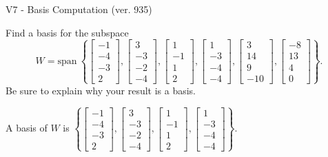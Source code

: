 \begin{exercise}
  \begin{exerciseTitle}V7 - Basis Computation (ver. 935)\end{exerciseTitle}
  \begin{exerciseStatement}
    Find a basis for the subspace 
\[W=\mathrm{span}\ \left\{\left[\begin{array}{r}
-1 \\
-4 \\
-3 \\
2
\end{array}\right] , \left[\begin{array}{r}
3 \\
-3 \\
-2 \\
-4
\end{array}\right] , \left[\begin{array}{r}
1 \\
-1 \\
1 \\
2
\end{array}\right] , \left[\begin{array}{r}
1 \\
-3 \\
-4 \\
-4
\end{array}\right] , \left[\begin{array}{r}
3 \\
14 \\
9 \\
-10
\end{array}\right] , \left[\begin{array}{r}
-8 \\
13 \\
4 \\
0
\end{array}\right]\right\}.\]
 Be sure to explain why your result is a basis.


  \end{exerciseStatement}
  \begin{exerciseAnswer}
   A basis of \(W\) is  \(\left\{\left[\begin{array}{r}
-1 \\
-4 \\
-3 \\
2
\end{array}\right] , \left[\begin{array}{r}
3 \\
-3 \\
-2 \\
-4
\end{array}\right] , \left[\begin{array}{r}
1 \\
-1 \\
1 \\
2
\end{array}\right] , \left[\begin{array}{r}
1 \\
-3 \\
-4 \\
-4
\end{array}\right]\right\}\).
  


  \end{exerciseAnswer}
\end{exercise}